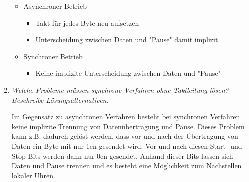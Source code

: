 \documentclass[hidelinks]{article}
\begin{document}
\begin{enumerate}
\begin{itemize}
	\item Asynchroner Betrieb
	\begin{itemize}
		\item Takt für jedes Byte neu aufsetzen
		\item Unterscheidung zwischen Daten und "Pause" damit implizit		
	\end{itemize}	
	\newpage
	\item Synchroner Betrieb
	\begin{itemize}
		\item Keine implizite Unterscheidung zwischen Daten und "Pause"
	\end{itemize}
\end{itemize}

\item \textit{Welche Probleme müssen synchrone Verfahren ohne Taktleitung lösen?\\ Beschreibe Lösungsalternativen.}

Im Gegensatz zu asynchronen Verfahren besteht bei synchronen Verfahren keine implizite Trennung von Datenübertragung und Pause. Dieses Problem kann z.B. dadurch gelöst werden, dass vor und nach der Übertragung von Daten ein Byte mit nur 1en gesendet wird. Vor und nach diesen Start- und Stop-Bits werden dann nur 0en gesendet. Anhand dieser Bits lassen sich Daten und Pause trennen und es besteht eine Möglichkeit zum Nachstellen lokaler Uhren.
\end{enumerate}
\end{document}
